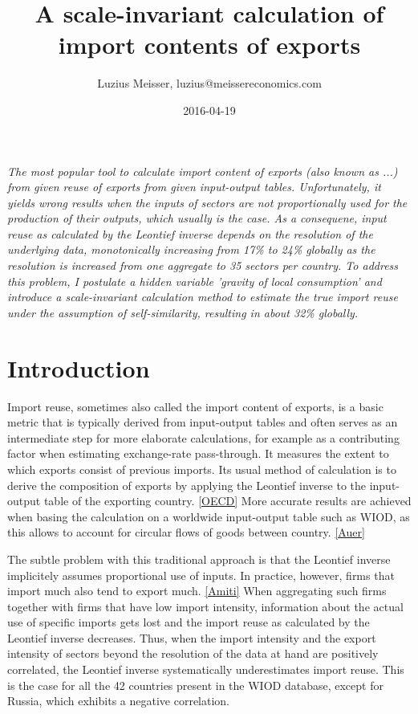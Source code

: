 \documentclass{paper}
\begin{document}
\title{A scale-invariant calculation of import contents of exports}


\author{Luzius Meisser, luzius@meissereconomics.com}

\date{2016-04-19}

\maketitle

\emph{The most popular tool to calculate import content of exports (also known as ...) from given reuse of exports from given input-output tables. Unfortunately, it yields wrong results when the inputs of sectors are not proportionally used for the production of their outputs, which usually is the case. As a consequene, input reuse as calculated by the Leontief inverse depends on the resolution of the underlying data, monotonically increasing from 17\% to 24\% globally as the resolution is increased from one aggregate to 35 sectors per country. To address this problem, I postulate a hidden variable 'gravity of local consumption' and introduce a scale-invariant calculation method to estimate the true import reuse under the assumption of self-similarity, resulting in about 32\% globally.}

\section{Introduction}
Import reuse, sometimes also called the import content of exports, is a basic metric that is typically derived from input-output tables and often serves as an intermediate step for more elaborate calculations, for example as a contributing factor when estimating exchange-rate pass-through. It measures the extent to which exports consist of previous imports. Its usual method of calculation is to derive the composition of exports by applying the Leontief inverse to the input-output table of the exporting country. \ref{OECD} More accurate results are achieved when basing the calculation on a worldwide input-output table such as WIOD, as this allows to account for circular flows of goods between country. \ref{Auer}

The subtle problem with this traditional approach is that the Leontief inverse implicitely assumes proportional use of inputs. In practice, however, firms that import much also tend to export much. \ref{Amiti} When aggregating such firms together with firms that have low import intensity, information about the actual use of specific imports gets lost and the import reuse as calculated by the Leontief inverse decreases. Thus, when the import intensity and the export intensity of sectors beyond the resolution of the data at hand are positively correlated, the Leontief inverse systematically underestimates import reuse. This is the case for all the 42 countries present in the WIOD database, except for Russia, which exhibits a negative correlation.
\end{document}
